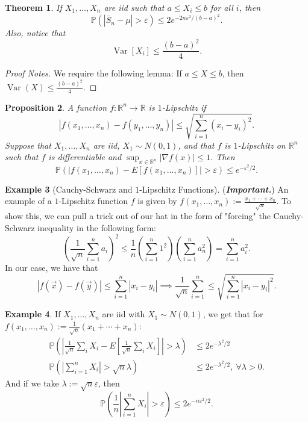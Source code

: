 \documentclass[12pt,reqno]{article}
\renewcommand{\emph}[1]{\textit{#1}}
\theoremstyle{plain}
\newtheorem{theorem}{Theorem}[section]
\newtheorem{prop}[theorem]{Proposition}
\theoremstyle{definition}
\newtheorem{example}[theorem]{Example}
\begin{document}
\begin{theorem}
If $X_1,\ldots,X_n$ are iid such that $a \leq X_i \leq b$ for all $i$, then 
$$\mathbb{P}(|\bar{S}_n-\mu| > \varepsilon) \leq 
  2e^{-2n\varepsilon^2 / (b-a)^2}.$$ 
Also, notice that 
\[
\operatorname{Var}[X_i] \leq \frac{(b-a)^2}{4}. 
\]
\end{theorem} 
\begin{proof}[Proof Notes]
We require the following lemma: If $a \leq X \leq b$, then 
$\operatorname{Var}(X) \leq \frac{(b-a)^2}{4}$. 
\end{proof} 

\begin{prop} 
A function $f: \mathbb{R}^n \rightarrow \mathbb{R}$ is 
\emph{$1$-Lipschitz} if 
$$|f(x_1,\ldots,x_n) - f(y_1,\ldots,y_n)| \leq 
  \sqrt{\sum_{i=1}^n (x_i-y_i)^2}.$$ 
Suppose that $X_1,\ldots,X_n$ are iid, $X_1 \sim N(0, 1)$, and that $f$ 
is $1$-Lipschitz on $\mathbb{R}^n$ such that $f$ is differentiable and 
$\sup_{x \in \mathbb{R}^n} |\nabla f(x)| \leq 1$. Then 
$$\mathbb{P}\left(|f(x_1,\ldots,x_n) - E[f(x_1,\ldots,x_n)]| > 
  \varepsilon\right) \leq e^{-\varepsilon^2 / 2}.$$ 
\end{prop} 

\begin{example}[Cauchy-Schwarz and $1$-Lipschitz Functions] 
(\textbf{\emph{Important.}}) 
An example of a $1$-Lipschitz function $f$ is given by 
$f(x_1,\ldots,x_n) := \frac{x_1+\cdots+x_n}{\sqrt{n}}$. 
To show this, we can pull a trick out of our hat in the form of 
"forcing" the Cauchy-Schwarz inequality in the following form:
\[
\left(\frac{1}{\sqrt{n}} \sum_{i=1}^n a_i\right)^2 \leq 
     \frac{1}{n} \left(\sum_{i=1}^n 1^2\right)\left(\sum_{i=1}^n 
     a_n^2\right) = \sum_{i=1}^n a_i^2. 
\]
In our case, we have that 
\[
|f(\vec{x}) - f(\vec{y})| \leq \sum_{i=1}^n |x_i-y_i| \implies 
     \frac{1}{\sqrt{n}} \sum_{i=1}^n \leq \sqrt{\sum_{i=1}^n 
     |x_i-y_i|^2}. 
\]
\end{example} 

\begin{example}
If $X_1,\ldots,X_n$ are iid with $X_1 \sim N(0, 1)$, we get that for 
$f(x_1,\ldots,x_n) := \frac{1}{\sqrt{n}}(x_1+\cdots+x_n)$:
\begin{align*} 
\mathbb{P}\left(\left\lvert \frac{1}{\sqrt{n}} \sum_i X_i - 
     E\left[\frac{1}{\sqrt{n}} \sum_i X_i\right]\right\rvert > 
     \lambda\right) & \leq 2e^{-\lambda^2/2} \\ 
\mathbb{P}\left(\left\lvert\sum_{i=1}^n X_i\right\rvert > \sqrt{n}\lambda 
     \right) & \leq 2e^{-\lambda^2/2},\ \forall \lambda > 0. 
\end{align*} 
And if we take $\lambda := \sqrt{n} \varepsilon$, then 
\[
\mathbb{P}\left(\frac{1}{n}\left\lvert \sum_{i=1}^n X_i\right\rvert > 
     \varepsilon\right) \leq 2e^{-n\varepsilon^2 / 2}. 
\]
\end{example} 
\end{document}
